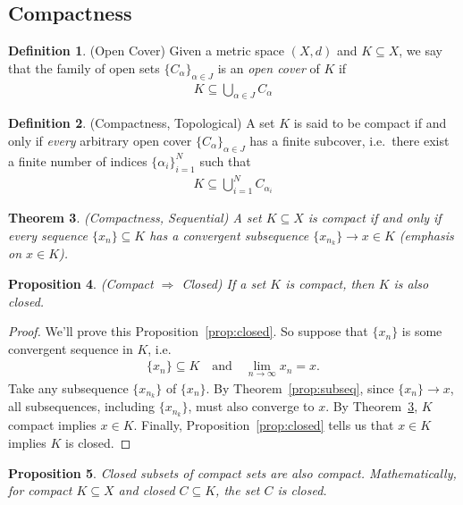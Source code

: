 \documentclass[12pt]{article}
\theoremstyle{plain}
\newtheorem{thm}{Theorem}[section]
\newtheorem{prop}[thm]{Proposition}
\theoremstyle{definition}
\newtheorem{defn}[thm]{Definition}
\theoremstyle{remark}
\begin{document}
\subsection{Compactness}

\begin{defn}{(Open Cover)}
Given a metric space $(X,d)$ and $K\subseteq X$, we say that the family
of open sets $\{C_\alpha\}_{\alpha \in J}$ is an \emph{open cover} of
$K$ if
\begin{align*}
  K \subseteq \bigcup_{\alpha \in J} C_\alpha
\end{align*}
\end{defn}

\begin{defn}{(Compactness, Topological)}
A set $K$ is said to be compact if and only if \emph{every} arbitrary
open cover $\{C_\alpha\}_{\alpha \in J}$ has a finite subcover, i.e.\
there exist a finite number of indices $\{\alpha_i\}_{i=1}^N$ such that
\begin{align*}
  K \subseteq \bigcup_{i=1}^N C_{\alpha_i}
\end{align*}
\end{defn}

\begin{thm}{\emph{(Compactness, Sequential)}}
\label{thm:compact}
A set $K\subseteq X$ is compact if and only if every sequence
$\{x_n\}\subseteq K$ has a convergent subsequence $\{x_{n_k}\}
\rightarrow x \in K$ (emphasis on $x\in K$).
\end{thm}

\begin{prop}{\emph{(Compact $\Rightarrow$ Closed)}}
\label{prop:compact-closed}
If a set $K$ is compact, then $K$ is also closed.
\end{prop}
\begin{proof}
We'll prove this Proposition~\ref{prop:closed}. So suppose that
$\{x_n\}$ is some convergent sequence in $K$, i.e.
\begin{align*}
  \{x_n\} \subseteq K
  \quad \text{and}\quad
  \lim_{n\rightarrow \infty} x_n=x.
\end{align*}
Take any subsequence $\{x_{n_k}\}$ of $\{x_n\}$.
By Theorem~\ref{prop:subseq}, since $\{x_n\}\rightarrow x$, all
subsequences, including $\{x_{n_k}\}$, must also converge to $x$. By
Theorem~\ref{thm:compact}, $K$ compact implies $x\in K$.  Finally,
Proposition~\ref{prop:closed} tells us that $x\in K$ implies $K$ is
closed.
\end{proof}

\begin{prop}
Closed subsets of compact sets are also compact. Mathematically, for
compact $K\subseteq X$ and closed $C \subseteq K$, the set $C$ is
closed.
\end{prop}
\end{document}
